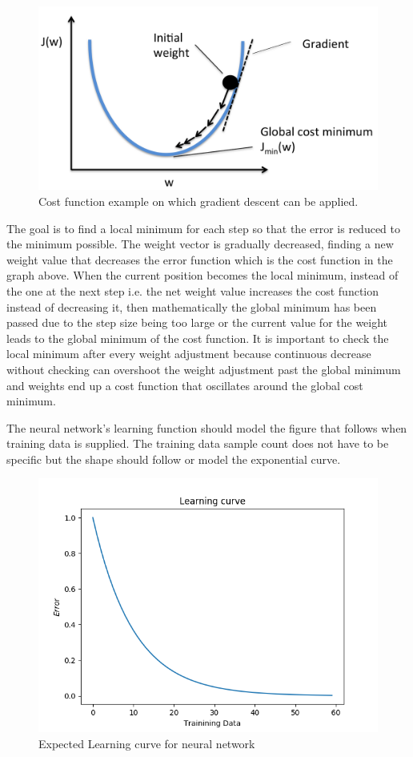 \begin{figure}[h]
	\centering
	\includegraphics[scale=0.2]{31}
	\caption{Cost function example on which gradient descent can be applied.}
\end{figure}

The goal is to find a local minimum for each step so that the error is reduced to the minimum possible. The weight vector is gradually decreased, finding a new weight value that decreases the error function which is the cost function in the graph above. When the current position becomes the local minimum, instead of the one at the next step i.e. the net weight value increases the cost function instead of decreasing it, then mathematically the global minimum has been passed due to the step size being too large or the current value for the weight leads to the global minimum of the cost function. It is important to check the local minimum after every weight adjustment because continuous decrease without checking can overshoot the weight adjustment past the global minimum and weights end up a cost function that oscillates around the global cost minimum.

The neural network's learning function should model the figure that follows when  training data is supplied. The training data sample count does not have to be specific but the shape should follow or model the exponential curve. 

\begin{figure}[h]
	\centering
	\includegraphics[scale=0.6]{30}
	\caption{Expected Learning curve for neural network}
\end{figure}

